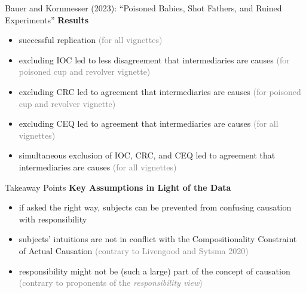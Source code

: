 \documentclass[xcolor=table,9pt,aspectratio=169]{beamer}
\begin{document}
\begin{frame}{\vspace*{10mm}Bauer and Kornmesser (2023): ``Poisoned Babies, Shot Fathers, and Ruined Experiments''}
\vspace*{-5mm}
\textbf{Results}\\
\begin{itemize}
   \item successful replication \textcolor{gray}{(for all vignettes)}
   \item excluding IOC led to less disagreement that intermediaries are causes \textcolor{gray}{(for poisoned cup and revolver vignette)}
   \item excluding CRC led to agreement that intermediaries are causes \textcolor{gray}{(for poisoned cup and revolver vignette)}
   \item excluding CEQ led to agreement that intermediaries are causes \textcolor{gray}{(for all vignettes)}
   \item simultaneous exclusion of IOC, CRC, and CEQ led to agreement that intermediaries are causes \textcolor{gray}{(for all vignettes)}
\end{itemize}
\vfill
\end{frame}


\begin{frame}{\vspace*{10mm}Takeaway Points}
\vspace*{-5mm}
\textbf{Key Assumptions in Light of the Data}
\begin{itemize}
   \item if asked the right way, subjects can be prevented from confusing causation with responsibility
   \item subjects' intuitions are not in conflict with the Compositionality Constraint of Actual Causation \textcolor{gray}{(contrary to Livengood and Sytsma 2020)}
   \item responsibility might not be (such a large) part of the concept of causation \textcolor{gray}{(contrary to proponents of the \textit{responsibility view})}
\end{itemize}
\vfill
\end{frame}
\end{document}
